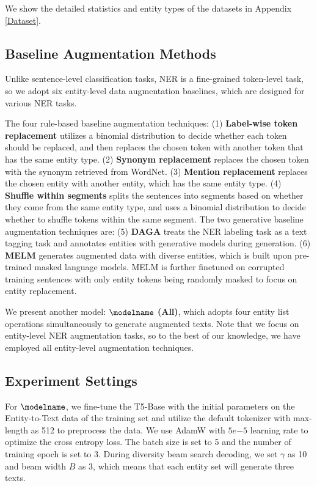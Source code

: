 We show the detailed statistics and entity types of the datasets in Appendix \ref{Dataset}.

\subsection{Baseline Augmentation Methods}
Unlike sentence-level classification tasks, NER is a fine-grained token-level task, so we adopt six entity-level data augmentation baselines, which are designed for various NER tasks.

The four rule-based baseline augmentation techniques: (1) \textbf{Label-wise token replacement} \cite{dai-adel-2020-analysis} utilizes a binomial distribution to decide whether each token should be replaced, and then replaces the chosen token with another token that has the same entity type. (2) \textbf{Synonym replacement} \cite{dai-adel-2020-analysis} replaces the chosen token with the synonym retrieved from WordNet. (3) \textbf{Mention replacement} \cite{dai-adel-2020-analysis} replaces the chosen entity with another entity, which has the same entity type. (4) \textbf{Shuffle within segments} \cite{dai-adel-2020-analysis} splits the sentences into segments based on whether they come from the same entity type, and uses a binomial distribution to decide whether to shuffle tokens within the same segment. The two generative baseline augmentation techniques are: (5) \textbf{DAGA} \cite{ding-etal-2020-daga} treats the NER labeling task as a text tagging task and annotates entities with generative models during generation. (6) \textbf{MELM} \cite{zhou2022melm} generates augmented data with diverse entities, which is built upon pre-trained masked language models. MELM is further finetuned on corrupted training sentences with only entity tokens being randomly masked to focus on entity replacement.

We present another model: \textbf{$\modelname$  (All)}, which adopts four entity list operations simultaneously to generate augmented texts. Note that we focus on entity-level NER augmentation tasks, so to the best of our knowledge, we have employed all entity-level augmentation techniques.

\subsection{Experiment Settings}
For $\modelname$, we fine-tune the T5-Base \cite{raffel2020exploring} with the initial parameters on the Entity-to-Text data of the training set and utilize the default tokenizer with max-length as 512 to preprocess the data. We use AdamW \cite{loshchilov2018fixing} with $5e{-5}$ learning rate to optimize the cross entropy loss. The batch size is set to 5 and the number of training epoch is set to 3. During diversity beam search decoding, we set $\gamma$ as 10 and beam width ${B}$ as 3, which means that each entity set will generate three texts. 

